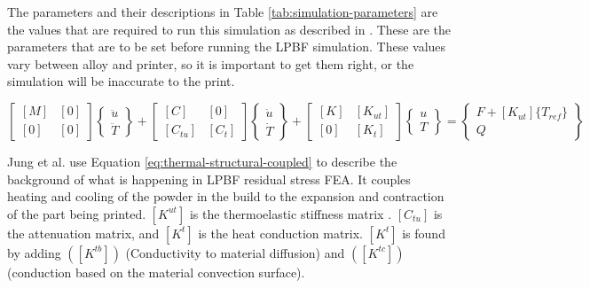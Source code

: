 \indent The parameters and their descriptions in Table \ref{tab:simulation-parameters} are the values that are required to run this simulation as described in \cite{ansys_lpbf_simulation_guide_2025r1}.  These are the parameters that are to be set before running the LPBF simulation.  These values vary between alloy and printer, so it is important to get them right, or the simulation will be inaccurate to the print.

\begin{equation}[H]
\begin{bmatrix}
[M] & [0] \\
[0] & [0]
\end{bmatrix}
\begin{Bmatrix}
\ddot{u} \\
\ddot{T}
\end{Bmatrix}
+
\begin{bmatrix}
[C] & [0] \\
[C_{tu}] & [C_t]
\end{bmatrix}
\begin{Bmatrix}
\dot{u} \\
\dot{T}
\end{Bmatrix}
+
\begin{bmatrix}
[K] & [K_{ut}] \\
[0] & [K_t]
\end{bmatrix}
\begin{Bmatrix}
u \\
T
\end{Bmatrix}
=
\begin{Bmatrix}
F + [K_{ut}]\{T_{ref}\} \\
Q
\end{Bmatrix}
\label{eq:thermal-structural-coupled}
\end{equation}

Jung et al. \cite{jung2022numerical} use Equation \ref{eq:thermal-structural-coupled} to describe the background of what is happening in LPBF residual stress FEA.  It couples heating and cooling of the powder in the build to the expansion and contraction of the part being printed.  $[K^{ut}]$ is the thermoelastic stiffness matrix \cite{jung2022numerical}.  $[C_{tu}]$ is the attenuation matrix, and $[K^{t}]$ is the heat conduction matrix.  $[K^{t}]$ is found by adding $([K^{tb}])$ (Conductivity to material diffusion) and $([K^{tc}])$ (conduction based on the material convection surface).


